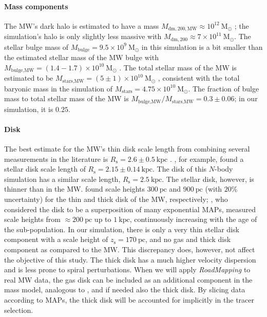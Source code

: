 \documentclass[iop,revtex4,numberedappendix,appendixfloats]{emulateapj}
\newcommand{\RM}{{\sl RoadMapping}}
\begin{document}
\paragraph{Mass components} The MW's dark halo is estimated to have a mass $M_{\text{dm},200,\text{MW}}\approx10^{12}~\text{M}_\odot$ \citep{2016ARA&A..54..529B}; the simulation's halo is only slightly less massive with $M_{\text{dm},200}\approx7\times 10^{11}~\text{M}_\odot$. The stellar bulge mass of $M_\text{bulge}=9.5\times 10^9~\text{M}_\odot$ in this simulation is a bit smaller than the estimated stellar mass of the MW bulge with $M_\text{bulge,MW} = (1.4-1.7) \times 10^{10}~\text{M}_\odot$ \citep{2015MNRAS.448..713P}. The total stellar mass of the MW is estimated to be $M_\text{stars,MW} =(5\pm1)\times 10^{10}~\text{M}_\odot$ \citep{2013ApJ...779..115B,2016ARA&A..54..529B}, consistent with the total baryonic mass in the simulation of $M_\text{stars}=4.75\times 10^{10}~\text{M}_\odot$. The fraction of bulge mass to total stellar mass of the MW is $M_\text{bulge,MW}/M_\text{stars,MW}= 0.3\pm0.06$; in our simulation, it is $0.25$.

\paragraph{Disk} The best estimate for the MW's thin disk scale length from combining several measurements in the literature is $R_\text{s} = 2.6 \pm 0.5~\text{kpc}$ \citep{2016ARA&A..54..529B}. \citet{2013ApJ...779..115B}, for example, found a stellar disk scale length of $R_\text{s}=2.15\pm0.14~\text{kpc}$. The disk of this $N$-body simulation has a similar scale length, $R_\text{s} = 2.5~\text{kpc}$. The stellar disk, however, is thinner than in the MW. \citet{2008ApJ...673..864J} found scale heights $300~\text{pc}$ and $900~\text{pc}$ (with $20\%$ uncertainty) for the thin and thick disk of the MW, respectively; \citet{2012ApJ...753..148B}, who considered the disk to be a superposition of many exponential MAPs, measured scale heights from $\approx200~\text{pc}$ up to $1~\text{kpc}$, continuously increasing with the age of the sub-population. In our simulation, there is only a very thin stellar disk component with a scale height of $z_\text{s}=170~\text{pc}$, and no gas and thick disk component as compared to the MW. This discrepancy does, however, not affect the objective of this study. The thick disk has a much higher velocity dispersion and is less prone to spiral perturbations. When we will apply \RM{} to real MW data, the gas disk can be included as an additional component in the mass model, analogous to \citet{2013ApJ...779..115B}, and if needed also the thick disk. By slicing data according to MAPs, the thick disk will be accounted for implicitly in the tracer selection.
\end{document}
